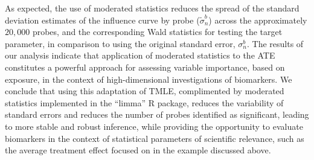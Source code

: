 As expected, the use of moderated statistics reduces the spread of the standard
deviation estimates of the influence curve by probe ($\widetilde{\sigma}^b_n$)
across the approximately $20,000$ probes, and the corresponding Wald statistics
for testing the target parameter, in comparison to using the original standard
error, $\sigma^b_n$. The results of our analysis indicate that application of
moderated statistics to the ATE constitutes a powerful approach for assessing
variable importance, based on exposure, in the context of high-dimensional
investigations of biomarkers. We conclude that using this adaptation of TMLE,
complimented by moderated statistics implemented in the ``limma'' R package,
reduces the variability of standard errors and reduces the number of probes
identified as significant, leading to more stable and robust inference, while
providing the opportunity to evaluate biomarkers in the context of statistical
parameters of scientific relevance, such as the average treatment effect focused
on in the example discussed above.
